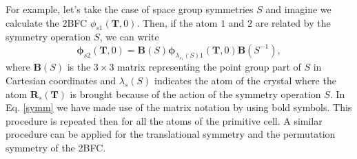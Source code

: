 For example, let's take the case of space group symmetries $S$ and imagine we calculate the 2BFC 
$\phi_{s1}(\mathbf{T}, 0)$. Then, if the atom $1$ and $2$ are related by the symmetry 
operation $S$, we can write 
\begin{equation}
\label{symm}
\boldsymbol{\phi}_{s2}(\mathbf{T},0)=\mathbf{B}(S)\boldsymbol{\phi}_{\lambda_{s_{1}}(S)1}(\mathbf{T},0)\mathbf{B}(S^{-1}),
\end{equation}
where $\mathbf{B}(S)$ is the $3\times3$ matrix representing the point group part of $S$ in Cartesian coordinates and 
$\lambda_{s}(S)$ indicates the atom of the crystal where the atom $\mathbf{R}_{s}(\mathbf{T})$ is brought because of 
the action of the symmetry operation $S$. In Eq. \ref{symm} we have made use of the matrix notation by using bold symbols. This procedure is repeated then for all the atoms of the primitive cell. A similar procedure can be applied for the translational symmetry and the permutation symmetry of the 2BFC. \\



